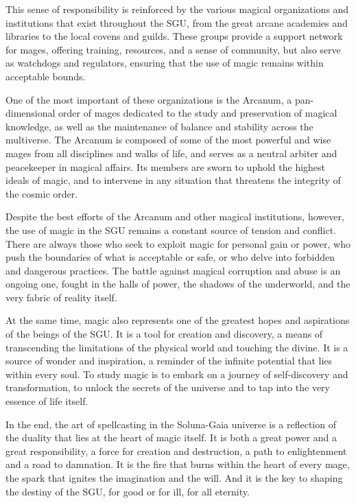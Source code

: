 \documentclass[12pt]{article}
\begin{document}
This sense of responsibility is reinforced by the various magical organizations and institutions that exist throughout the SGU, from the great arcane academies and libraries to the local covens and guilds. These groups provide a support network for mages, offering training, resources, and a sense of community, but also serve as watchdogs and regulators, ensuring that the use of magic remains within acceptable bounds.

One of the most important of these organizations is the Arcanum, a pan-dimensional order of mages dedicated to the study and preservation of magical knowledge, as well as the maintenance of balance and stability across the multiverse. The Arcanum is composed of some of the most powerful and wise mages from all disciplines and walks of life, and serves as a neutral arbiter and peacekeeper in magical affairs. Its members are sworn to uphold the highest ideals of magic, and to intervene in any situation that threatens the integrity of the cosmic order.

Despite the best efforts of the Arcanum and other magical institutions, however, the use of magic in the SGU remains a constant source of tension and conflict. There are always those who seek to exploit magic for personal gain or power, who push the boundaries of what is acceptable or safe, or who delve into forbidden and dangerous practices. The battle against magical corruption and abuse is an ongoing one, fought in the halls of power, the shadows of the underworld, and the very fabric of reality itself.

At the same time, magic also represents one of the greatest hopes and aspirations of the beings of the SGU. It is a tool for creation and discovery, a means of transcending the limitations of the physical world and touching the divine. It is a source of wonder and inspiration, a reminder of the infinite potential that lies within every soul. To study magic is to embark on a journey of self-discovery and transformation, to unlock the secrets of the universe and to tap into the very essence of life itself.

In the end, the art of spellcasting in the Soluna-Gaia universe is a reflection of the duality that lies at the heart of magic itself. It is both a great power and a great responsibility, a force for creation and destruction, a path to enlightenment and a road to damnation. It is the fire that burns within the heart of every mage, the spark that ignites the imagination and the will. And it is the key to shaping the destiny of the SGU, for good or for ill, for all eternity.
\end{document}
